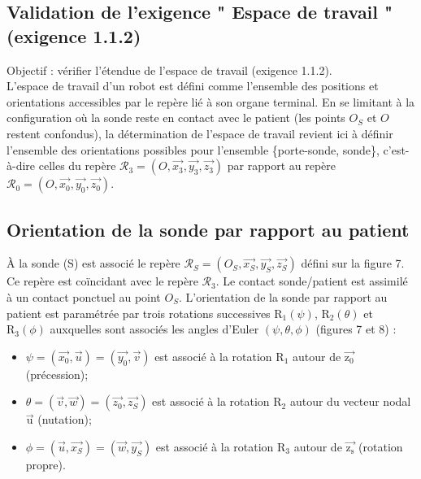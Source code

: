 \subsection{Validation de l'exigence " Espace de travail " (exigence 1.1.2)}

Objectif : vérifier l'étendue de l'espace de travail (exigence 1.1.2).\\
L'espace de travail d'un robot est défini comme l'ensemble des positions et orientations accessibles par le repère lié à son organe terminal. En se limitant à la configuration où la sonde reste en contact avec le patient (les points $O_{S}$ et $O$ restent confondus), la détermination de l'espace de travail revient ici à définir l'ensemble des orientations possibles pour l'ensemble \{porte-sonde, sonde\}, c'est-à-dire celles du repère $\mathcal{R}_{3}=\left(O, \overrightarrow{x_{3}}, \overrightarrow{y_{3}}, \overrightarrow{z_{3}}\right)$ par rapport au repère $\mathcal{R}_{0}=\left(O, \overrightarrow{x_{0}}, \overrightarrow{y_{0}}, \overrightarrow{z_{0}}\right)$.

\subsection*{Orientation de la sonde par rapport au patient}
À la sonde (S) est associé le repère $\mathcal{R}_{S}=\left(O_{S}, \overrightarrow{x_{S}}, \overrightarrow{y_{S}}, \overrightarrow{z_{S}}\right)$ défini sur la figure 7. Ce repère est coïncidant avec le repère $\mathcal{R}_{3}$. Le contact sonde/patient est assimilé à un contact ponctuel au point $O_{S}$. L'orientation de la sonde par rapport au patient est paramétrée par trois rotations successives $\mathrm{R}_{1}(\psi)$, $\mathrm{R}_{2}(\theta)$ et $\mathrm{R}_{3}(\phi)$ auxquelles sont associés les angles d'Euler $(\psi, \theta, \phi)$ (figures 7 et 8) :

\begin{itemize}
  \item[-] $\psi=\left(\overrightarrow{x_{0}}, \vec{u}\right)=\left(\overrightarrow{y_{0}}, \vec{v}\right)$ est associé à la rotation $\mathrm{R}_{1}$ autour de $\overrightarrow{\mathrm{z}_{0}}$ (précession);
  \item[-] $\theta=(\vec{v}, \vec{w})=\left(\overrightarrow{z_{0}}, \overrightarrow{z_{S}}\right)$ est associé à la rotation $\mathrm{R}_{2}$ autour du vecteur nodal $\overrightarrow{\mathrm{u}}$ (nutation);
  \item[-] $\phi=\left(\vec{u}, \overrightarrow{x_{S}}\right)=\left(\vec{w}, \overrightarrow{y_{S}}\right)$ est associé à la rotation $\mathrm{R}_{3}$ autour de $\overrightarrow{\mathrm{z}_{\mathrm{s}}}$ (rotation propre).
\end{itemize}

